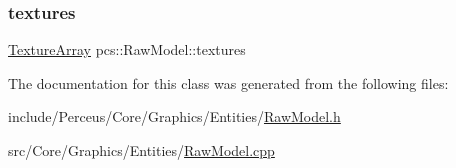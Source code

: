 \mbox{\label{classpcs_1_1RawModel_a5441811d19297669eefdb405ea94ce0c}} 
\subsubsection{\texorpdfstring{textures}{textures}}
{\footnotesize\ttfamily \hyperlink{unionpcs_1_1TextureArray}{Texture\+Array} pcs\+::\+Raw\+Model\+::textures\hspace{0.3cm}{\ttfamily [private]}}



The documentation for this class was generated from the following files\+:\begin{DoxyCompactItemize}
\item 
include/\+Perceus/\+Core/\+Graphics/\+Entities/\hyperlink{RawModel_8h}{Raw\+Model.\+h}\item 
src/\+Core/\+Graphics/\+Entities/\hyperlink{RawModel_8cpp}{Raw\+Model.\+cpp}\end{DoxyCompactItemize}
